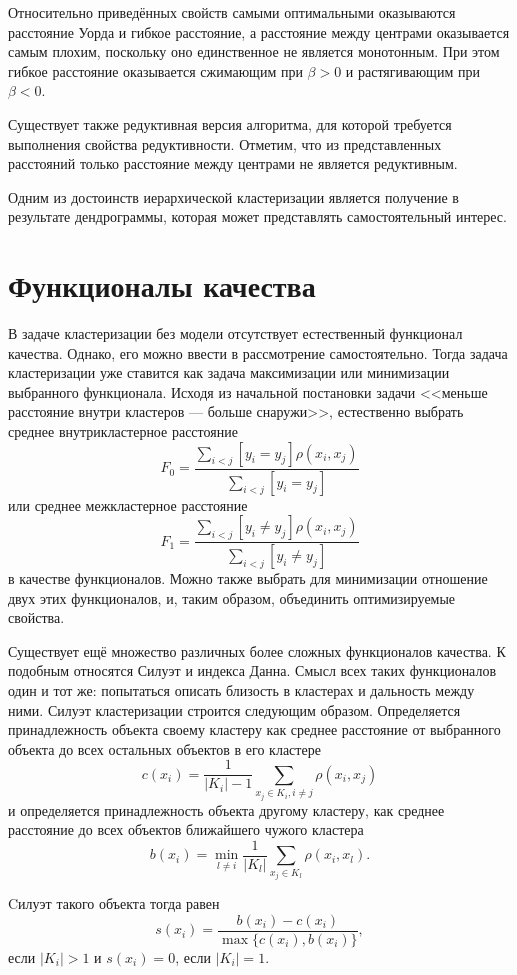 \documentclass[10pt]{article}
\begin{document}
Относительно приведённых свойств самыми оптимальными оказываются расстояние Уорда и гибкое расстояние, 
а расстояние между центрами оказывается самым плохим, поскольку оно единственное не является монотонным. 
При этом гибкое расстояние оказывается сжимающим при $\beta >0$ и растягивающим при $\beta <0$. 

Существует также редуктивная версия алгоритма, для которой требуется выполнения свойства редуктивности. 
Отметим, что из представленных расстояний только расстояние между центрами не является редуктивным.

Одним из достоинств иерархической кластеризации является получение в результате дендрограммы, которая может представлять самостоятельный интерес. 

\section{Функционалы качества}

В задаче кластеризации без модели отсутствует естественный функционал качества. Однако, его можно ввести в рассмотрение самостоятельно. 
Тогда задача кластеризации уже ставится как задача максимизации или минимизации выбранного функционала.
Исходя из начальной постановки задачи <<меньше расстояние внутри кластеров --- больше снаружи>>, естественно выбрать среднее внутрикластерное расстояние 
$$F_0=\frac{\sum_{i<j} [y_i=y_j] \rho(x_i, x_j)}{\sum_{i<j} [y_i=y_j]}$$
или среднее межкластерное расстояние 
$$F_1=\frac{\sum_{i<j} [y_i \neq y_j] \rho(x_i, x_j)}{\sum_{i<j} [y_i \neq y_j]}$$
в качестве функционалов. 
Можно также выбрать для минимизации отношение двух этих функционалов, и, таким образом, объединить оптимизируемые свойства. 

Существует ещё множество различных более сложных функционалов качества. К подобным относятся Силуэт и индекса Данна. 
Смысл всех таких функционалов один и тот же: попытаться описать близость в кластерах и дальность между ними. Силуэт кластеризации строится следующим образом.
Определяется принадлежность объекта своему кластеру как среднее расстояние от выбранного объекта до всех остальных объектов в его кластере 
$$c(x_i) = \frac{1}{|K_i| - 1} \sum_{x_j \in K_i, i \neq j} \rho(x_i, x_j)$$
и определяется принадлежность объекта другому кластеру, как среднее расстояние до всех объектов ближайшего чужого кластера 
$$b(x_i) = \min_{l \neq i} \frac{1}{|K_l|} \sum_{x_j \in K_l} \rho(x_i, x_l).$$

Cилуэт такого объекта тогда равен 
$$s(x_i) = \frac{b(x_i) - c(x_i)}{\max \{ c(x_i), b(x_i) \}},$$ 
если $|K_i| > 1$ и $s(x_i) =0 $, если $|K_i|=1.$
\end{document}
